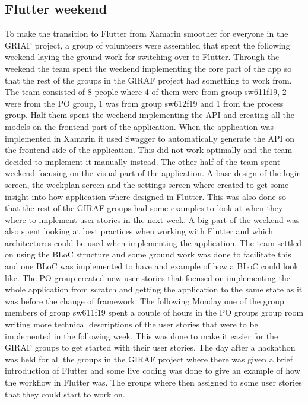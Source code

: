 \subsection{Flutter weekend}
To make the transition to Flutter from Xamarin smoother for everyone in the GRIAF project, a group of volunteers were assembled that spent the following weekend laying the ground work for switching over to Flutter. 
Through the weekend the team spent the weekend implementing the core part of the app so that the rest of the groups in the GIRAF project had something to work from. 
The team consisted of 8 people where 4 of them were from group sw611f19, 2 were from the PO group, 1 was from group sw612f19 and 1 from the process group. 
Half them spent the weekend implementing the API and creating all the models on the frontend part of the application. 
When the application was implemented in Xamarin it used Swagger to automatically generate the API on the frontend side of the application. This did not work optimally and the team decided to implement it manually instead.
The other half of the team spent weekend focusing on the visual part of the application. A base design of the login screen, the weekplan screen and the settings screen where created to get some insight into how application where designed in Flutter. This was also done so that the rest of the GIRAF groups had some examples to look at when they where to implement user stories in the next week.
A big part of the weekend was also spent looking at best practices when working with Flutter and which architectures could be used when implementing the application. 
The team settled on using the BLoC structure and some ground work was done to facilitate this and one BLoC was implemented to have and example of how a BLoC could look like.
The PO group created new user stories that focused on implementing the whole application from scratch and getting the application to the same state as it was before the change of framework.
The following Monday one of the group members of group sw611f19 spent a couple of hours in the PO groups group room writing more technical descriptions of the user stories that were to be implemented in the following week. This was done to make it easier for the GIRAF groups to get started with their user stories.
The day after a hackathon was held for all the groups in the GIRAF project where there was given a brief introduction of Flutter and some live coding was done to give an example of how the workflow in Flutter was. The groups where then assigned to some user stories that they could start to work on.

